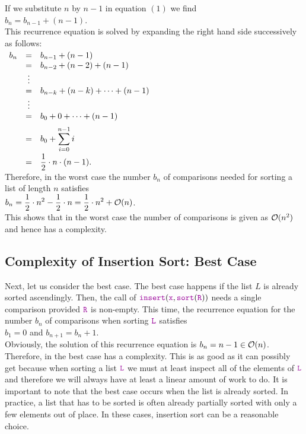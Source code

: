 If we substitute $n$ by $n-1$ in equation $(1)$ we find
\\[0.2cm]
\hspace*{1.3cm}
$b_n = b_{n-1} + (n - 1)$.
\\[0.2cm]
This recurrence equation is solved by expanding the right hand side successively as follows:
\\[0.2cm]
\hspace*{1.3cm}
$
\begin{array}[t]{lcl}
  b_{n} & = & b_{n-1} + (n - 1)                     \\ 
        & = & b_{n-2} + (n - 2) + (n - 1)           \\ 
        & \vdots &                                  \\
        & = & b_{n-k} + (n - k) + \cdots + (n - 1)  \\ 
        & \vdots &                                  \\
        & = & b_{0} + 0 + \cdots + (n - 1)      \\[0.2cm] 
        & = & \displaystyle b_{0} + \sum\limits_{i = 0}^{n - 1} i \\[0.4cm]
        & = & \displaystyle \frac{1}{2} \cdot n \cdot (n - 1).
\end{array}
$
\\[0.2cm]
Therefore, in the worst case the number $b_n$ of comparisons needed for sorting a list of length $n$ satisfies 
\\[0.2cm]
\hspace*{1.3cm}
$\displaystyle b_n = \frac{1}{2} \cdot n^2 - \frac{1}{2} \cdot n = \frac{1}{2} \cdot n^2 + \mathcal{O}(n)$.
\\[0.2cm]
This shows that in the worst case the number of comparisons is given as $\mathcal{O}(n^2)$ and hence
 has a  complexity.

\subsection{Complexity of Insertion Sort: Best Case}
Next, let us consider the best case.  The best case happens if the list $L$ is already sorted
ascendingly.  Then, the call of 
$\mytt{insert}(\mytt{x},\mytt{sort}(\mytt{R}))$ needs a single comparison provided $\mytt{R}$ is non-empty.  This time, the recurrence
equation for the number $b_n$ of comparisons when sorting $\mytt{L}$ satisfies
 \\[0.2cm]
\hspace*{1.3cm}
$b_1 = 0$ \quad and \quad $b_{n+1} = b_n + 1$. 
\\[0.2cm]
Obviously, the solution of this recurrence equation is $b_n = n-1 \in \mathcal{O}(n)$.  Therefore, in the best case
 has a  complexity.  This is as good as it can possibly get because when
sorting a list $\mytt{L}$ we must at least inspect all of the elements of $\mytt{L}$ and therefore we will
always have at least a linear amount of work to do.  It is important to note that the best case occurs when the
list is already sorted.  In practice, a list that has to be sorted is often already partially sorted with only
a few elements out of place.  In these cases, insertion sort can be a reasonable choice.


